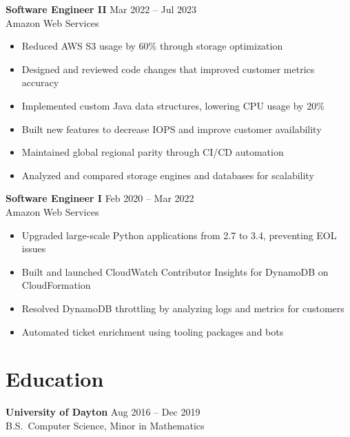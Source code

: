 \documentclass[11pt]{article}
\begin{document}
    \noindent\textbf{Software Engineer II} \hfill Mar 2022 -- Jul 2023 \\
    Amazon Web Services
    \begin{itemize}
        \item Reduced AWS S3 usage by 60\% through storage optimization
        \item Designed and reviewed code changes that improved customer metrics accuracy
        \item Implemented custom Java data structures, lowering CPU usage by 20\%
        \item Built new features to decrease IOPS and improve customer availability
        \item Maintained global regional parity through CI/CD automation
        \item Analyzed and compared storage engines and databases for scalability
    \end{itemize}

    \noindent\textbf{Software Engineer I} \hfill Feb 2020 -- Mar 2022 \\
    Amazon Web Services
    \begin{itemize}
        \item Upgraded large-scale Python applications from 2.7 to 3.4, preventing EOL issues
        \item Built and launched CloudWatch Contributor Insights for DynamoDB on CloudFormation
        \item Resolved DynamoDB throttling by analyzing logs and metrics for customers
        \item Automated ticket enrichment using tooling packages and bots
    \end{itemize}


    \section*{Education}
    \textbf{University of Dayton} \hfill Aug 2016 -- Dec 2019 \\
    B.S.\ Computer Science, Minor in Mathematics
\end{document}
